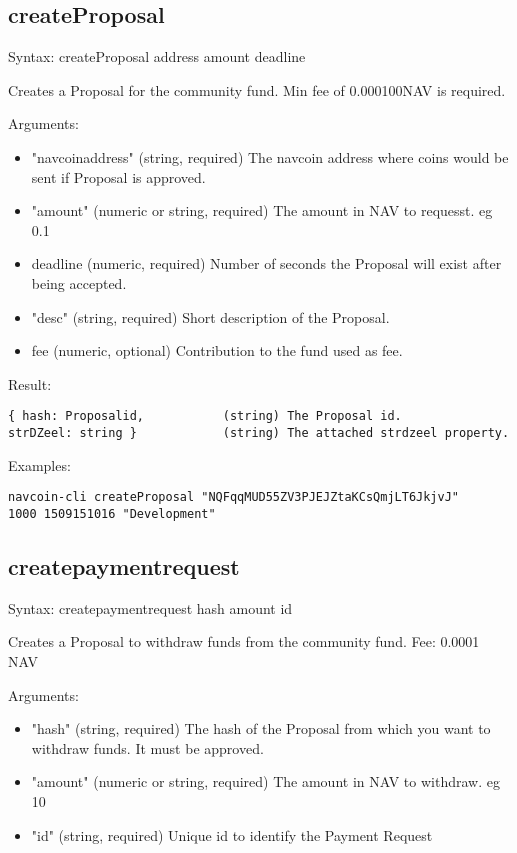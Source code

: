 \documentclass{artikel1}
\begin{document}
\begin{flushleft}
\subsection{createProposal}

Syntax: createProposal address amount deadline

Creates a Proposal for the community fund. Min fee of 0.000100NAV is required.

Arguments:
\begin{itemize}
\item "navcoinaddress"     (string, required) The navcoin address where coins would be sent if Proposal is approved.
\item  "amount"             (numeric or string, required) The amount in NAV to requesst. eg 0.1
\item  deadline               (numeric, required)  Number of seconds the Proposal will exist after being accepted.
\item  "desc"               (string, required) Short description of the Proposal.
\item  fee                    (numeric, optional) Contribution to the fund used as fee.
\end{itemize}

Result:
\begin{lstlisting}
{ hash: Proposalid,           (string) The Proposal id.
strDZeel: string }            (string) The attached strdzeel property.
\end{lstlisting}

Examples:
\begin{lstlisting}
navcoin-cli createProposal "NQFqqMUD55ZV3PJEJZtaKCsQmjLT6JkjvJ"
1000 1509151016 "Development"
\end{lstlisting}
\subsection{createpaymentrequest}
Syntax: createpaymentrequest hash amount id

Creates a Proposal to withdraw funds from the community fund. Fee: 0.0001 NAV

Arguments:
\begin{itemize}

\item "hash"               (string, required) The hash of the Proposal from which you want to withdraw funds. It must be approved.
\item "amount"             (numeric or string, required) The amount in NAV to withdraw. eg 10
\item "id"                 (string, required) Unique id to identify the Payment Request
\end{itemize}


\end{flushleft}
\end{document}

